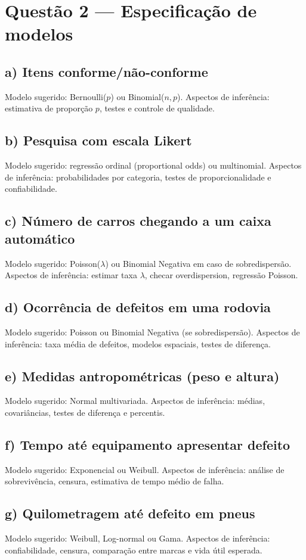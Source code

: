\documentclass[a4paper,12pt]{article}
\begin{document}
\newpage
\section*{Questão 2 — Especificação de modelos}

\subsection*{a) Itens conforme/não-conforme}
Modelo sugerido: Bernoulli($p$) ou Binomial($n,p$). \newline
Aspectos de inferência: estimativa de proporção $p$, testes e controle de qualidade.

\subsection*{b) Pesquisa com escala Likert}
Modelo sugerido: regressão ordinal (proportional odds) ou multinomial. \newline
Aspectos de inferência: probabilidades por categoria, testes de proporcionalidade e confiabilidade.

\subsection*{c) Número de carros chegando a um caixa automático}
Modelo sugerido: Poisson($\lambda$) ou Binomial Negativa em caso de sobredispersão. \newline
Aspectos de inferência: estimar taxa $\lambda$, checar overdispersion, regressão Poisson.

\subsection*{d) Ocorrência de defeitos em uma rodovia}
Modelo sugerido: Poisson ou Binomial Negativa (se sobredispersão). \newline
Aspectos de inferência: taxa média de defeitos, modelos espaciais, testes de diferença.

\subsection*{e) Medidas antropométricas (peso e altura)}
Modelo sugerido: Normal multivariada. \newline
Aspectos de inferência: médias, covariâncias, testes de diferença e percentis.

\subsection*{f) Tempo até equipamento apresentar defeito}
Modelo sugerido: Exponencial ou Weibull. \newline
Aspectos de inferência: análise de sobrevivência, censura, estimativa de tempo médio de falha.

\subsection*{g) Quilometragem até defeito em pneus}
Modelo sugerido: Weibull, Log-normal ou Gama. \newline
Aspectos de inferência: confiabilidade, censura, comparação entre marcas e vida útil esperada.
\end{document}

